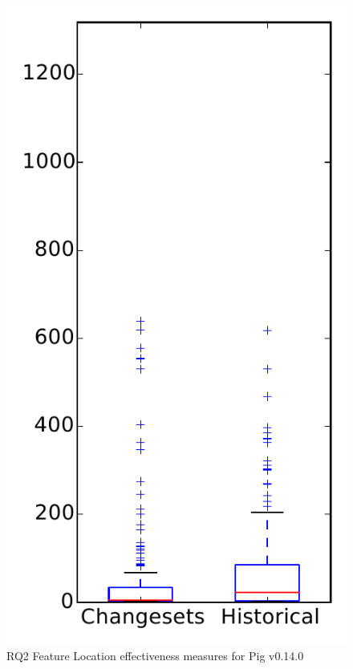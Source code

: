 
\begin{figure}
\centering
\includegraphics[height=0.4\textheight]{figures/flt/rq2_pig}
\caption{RQ2 Feature Location effectiveness measures for Pig v0.14.0}
\label{fig:flt:rq2:pig}
\end{figure}
